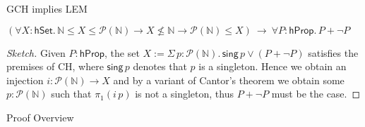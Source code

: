 \documentclass[xcolor=dvipsnames,compress,aspectratio=169,handout]{beamer}
\newcommand{\MBB}[1]{\ensuremath{\mathbb{#1}}\xspace}  %
\newcommand{\MCL}[1]{\ensuremath{\mathcal{#1}}\xspace} %
\newcommand{\Nat}{\MBB{N}}   %
\newcommand{\Pow}{\MCL P}
\begin{document}
\newcommand{\hprop}{\mathsf{hProp}}
\newcommand{\hset}{\mathsf{hSet}}
\newcommand{\Ord}{\mathsf{Ord}}

\begin{frame}{GCH implies LEM}
	\begin{lemma}
		$(\forall X:\hset.\,\Nat \le X\le \Pow(\Nat)\to X\not\le \Nat\to \Pow(\Nat)\le X)~\to~\forall P:\hprop.\,P+\neg P$
	\end{lemma}
	\begin{proof}[Sketch]
		Given $P:\hprop$, the set $X:=\Sigma\, p:\Pow(\Nat).\,\mathsf{sing}\,p\lor (P+\neg P)$ satisfies the premises of CH, where $\mathsf{sing}\,p$ denotes that $p$ is a singleton.
		Hence we obtain an injection $i:\Pow(\Nat)\to X$ and by a variant of Cantor's theorem we obtain some $p:\Pow(\Nat)$ such that $\pi_1(i\,p)$ is not a singleton, thus $P+\neg P$ must be the case.
	\end{proof}
\end{frame}

\begin{frame}
	\Huge
	\centering
	Proof Overview
\end{frame}
\end{document}
